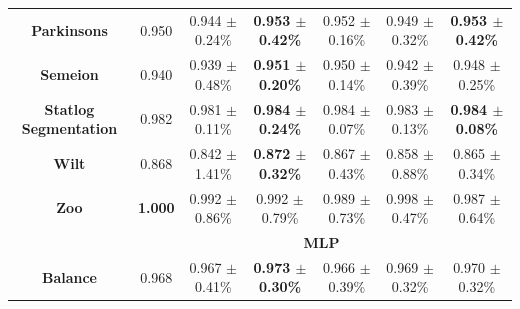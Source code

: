 \documentclass[iicol]{sn-jnl}
\theoremstyle{thmstyleone}%
\theoremstyle{thmstyletwo}%
\theoremstyle{thmstylethree}%
\begin{document}
\begin{table}
{\begin{tabular}{ccccccc}
\textbf{Parkinsons}             & {\color[HTML]{FE0000} 0.950}          & 0.944 $\pm$ 0.24\%                                 & \textbf{0.953 $\pm$ 0.42\%}                        & 0.952 $\pm$ 0.16\%                                 & 0.949 $\pm$ 0.32\%                                 & \textbf{0.953 $\pm$ 0.42\%}                        \\
\textbf{Semeion}                & 0.940                                 & 0.939 $\pm$ 0.48\%                                 & {\color[HTML]{FE0000} \textbf{0.951 $\pm$ 0.20\%}} & 0.950 $\pm$ 0.14\%                                 & 0.942 $\pm$ 0.39\%                                 & 0.948 $\pm$ 0.25\%                                 \\
\textbf{Statlog   Segmentation} & 0.982                                 & 0.981 $\pm$ 0.11\%                                 & \textbf{0.984 $\pm$ 0.24\%}                        & 0.984 $\pm$ 0.07\%                                 & 0.983 $\pm$ 0.13\%                                 & {\color[HTML]{FE0000} \textbf{0.984 $\pm$ 0.08\%}} \\
\textbf{Wilt}                   & 0.868                                 & 0.842 $\pm$ 1.41\%                                 & {\color[HTML]{FE0000} \textbf{0.872 $\pm$ 0.32\%}} & 0.867 $\pm$ 0.43\%                                 & 0.858 $\pm$ 0.88\%                                 & 0.865 $\pm$ 0.34\%                                 \\
\textbf{Zoo}                    & {\color[HTML]{FE0000} \textbf{1.000}} & 0.992 $\pm$ 0.86\%                                 & 0.992 $\pm$ 0.79\%                                 & 0.989 $\pm$ 0.73\%                                 & 0.998 $\pm$ 0.47\%                                 & 0.987 $\pm$ 0.64\%                                 \\ \hline
\textbf{}                       & \multicolumn{6}{c}{\textbf{MLP}}                                                                                                                                                                                                                                                           \\ \hline
\textbf{Balance}                & 0.968                                 & 0.967 $\pm$ 0.41\%                                 & {\color[HTML]{FE0000} \textbf{0.973 $\pm$ 0.30\%}} & 0.966 $\pm$ 0.39\%                                 & 0.969 $\pm$ 0.32\%                                 & 0.970 $\pm$ 0.32\%                                 \\

\end{tabular}}
\end{table}
\end{document}
